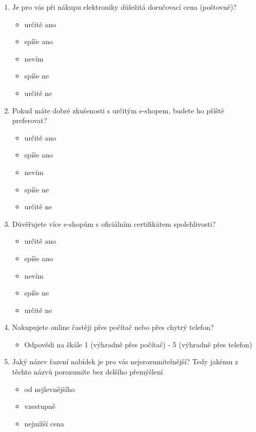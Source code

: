 \documentclass[12pt,twoside,openany]{fithesis}
\begin{document}
\begin{enumerate}
\item Je pro vás při nákupu elektroniky důležitá doručovací cena (poštovné)?
    \begin{itemize}
       \item určitě ano
       \item spíše ano
       \item nevím
       \item spíše ne
       \item určitě ne
    \end{itemize}

  \item Pokud máte dobré zkušenosti s určitým e-shopem, budete ho příště preferovat?
    \begin{itemize}
       \item určitě ano
       \item spíše ano
       \item nevím
       \item spíše ne
       \item určitě ne
    \end{itemize}

  \item Důvěřujete více e-shopům s oficiálním certifikátem spolehlivosti?
    \begin{itemize}
       \item určitě ano
       \item spíše ano
       \item nevím
       \item spíše ne
       \item určitě ne
    \end{itemize}

  \item Nakupujete online častěji přes počítač nebo přes chytrý telefon?
    \begin{itemize}
        \item Odpovědi na škále 1 (výhradně přes počítač) - 5 (výhradně přes telefon)
    \end{itemize}

  \item Jaký název řazení nabídek je pro vás nejsrozumitelnější? Tedy jakému z těchto názvů porozumíte bez delšího přemýšlení
    \begin{itemize}
       \item od nejlevnějšího
       \item vzestupně
       \item nejnižší cena
    \end{itemize}


\end{enumerate}
\end{document}
